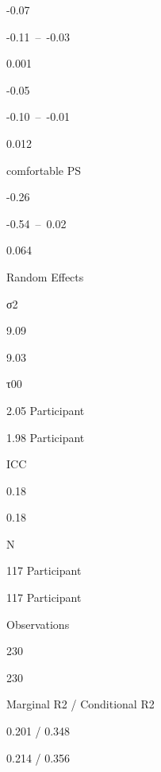 \documentclass[
]{article}
\begin{document}
-0.07

-0.11~--~-0.03

0.001

-0.05

-0.10~--~-0.01

0.012

comfortable PS

-0.26

-0.54~--~0.02

0.064

Random Effects

σ2

9.09

9.03

τ00

2.05 Participant

1.98 Participant

ICC

0.18

0.18

N

117 Participant

117 Participant

Observations

230

230

Marginal R2 / Conditional R2

0.201 / 0.348

0.214 / 0.356
\end{document}
